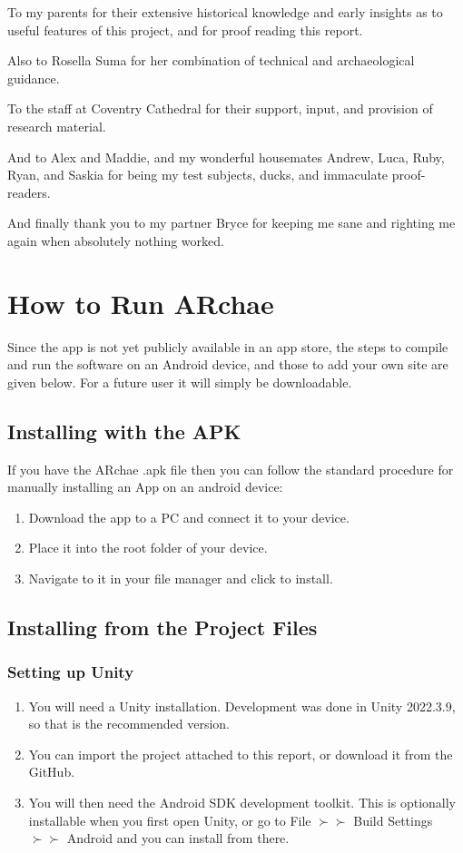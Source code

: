 \documentclass[12pt, a4paper]{article}
\begin{document}
To my parents for their extensive historical knowledge and early insights as to useful features of this project, and for proof reading this report.

Also to Rosella Suma for her combination of technical and archaeological guidance.

To the staff at Coventry Cathedral for their support, input, and provision of research material.

And to Alex and Maddie, and my wonderful housemates Andrew, Luca, Ruby, Ryan, and Saskia for being my test subjects, ducks, and immaculate proof-readers.

And finally thank you to my partner Bryce for keeping me sane and righting me again when absolutely nothing worked. 

\newpage


\newpage
\appendix

\section{How to Run ARchae}
\label{howtorun}
Since the app is not yet publicly available in an app store, the steps to compile and run the software on an Android device, and those to add your own site are given below. For a future user it will simply be downloadable.

\subsection{Installing with the APK}
If you have the ARchae .apk file then you can follow the standard procedure for manually installing an App on an android device:

\begin{enumerate}
    \item Download the app to a PC and connect it to your device.
    \item Place it into the root folder of your device.
    \item Navigate to it in your file manager and click to install.
\end{enumerate}

\subsection{Installing from the Project Files}

\subsubsection{Setting up Unity}
\begin{enumerate}
    \item You will need a Unity installation. Development was done in Unity 2022.3.9, so that is the recommended version.
    \item You can import the project attached to this report, or download it from the GitHub.
    \item You will then need the Android SDK development toolkit. This is optionally installable when you first open Unity, or go to File $\succ\succ$ Build Settings $\succ\succ$ Android and you can install from there.
\end{enumerate}
\end{document}
